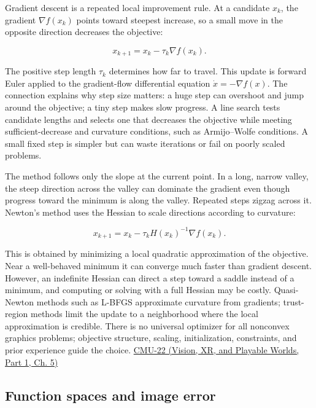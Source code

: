 Gradient descent is a repeated local improvement rule. At a candidate \(x_k\), the gradient \(\nabla f(x_k)\) points toward steepest increase, so a small move in the opposite direction decreases the objective:

\[
x_{k+1}=x_k-\tau_k\nabla f(x_k).
\]

The positive step length \(\tau_k\) determines how far to travel. This update is forward Euler applied to the gradient-flow differential equation \(\dot x=-\nabla f(x)\). The connection explains why step size matters: a huge step can overshoot and jump around the objective; a tiny step makes slow progress. A line search tests candidate lengths and selects one that decreases the objective while meeting sufficient-decrease and curvature conditions, such as Armijo--Wolfe conditions. A small fixed step is simpler but can waste iterations or fail on poorly scaled problems.

The method follows only the slope at the current point. In a long, narrow valley, the steep direction across the valley can dominate the gradient even though progress toward the minimum is along the valley. Repeated steps zigzag across it. Newton's method uses the Hessian to scale directions according to curvature:

\[
x_{k+1}=x_k-\tau_k H(x_k)^{-1}\nabla f(x_k).
\]

This is obtained by minimizing a local quadratic approximation of the objective. Near a well-behaved minimum it can converge much faster than gradient descent. However, an indefinite Hessian can direct a step toward a saddle instead of a minimum, and computing or solving with a full Hessian may be costly. Quasi-Newton methods such as L-BFGS approximate curvature from gradients; trust-region methods limit the update to a neighborhood where the local approximation is credible. There is no universal optimizer for all nonconvex graphics problems; objective structure, scaling, initialization, constraints, and prior experience guide the choice. \href{../07-Vision-XR-and-Playable-Worlds-P01/main.pdf\#nameddest=04-visual-computing-ii-ch036-cmu-22---optimization}{CMU-22 (Vision, XR, and Playable Worlds, Part 1, Ch. 5)}

\subsection{Function spaces and image error}\label{04-visual-computing-ii-ch029-function-spaces-and-image-error}

\hypertarget{04-visual-computing-ii-ch029-function-spaces-and-image-error}{}

